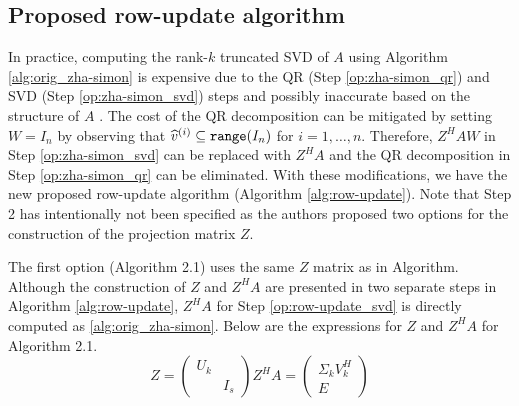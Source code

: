 \subsection{Proposed row-update algorithm}

In practice, computing the rank-$k$ truncated SVD of $A$ using Algorithm \ref{alg:orig_zha-simon} is expensive due to the QR (Step \ref{op:zha-simon_qr}) and SVD (Step \ref{op:zha-simon_svd}) steps and possibly inaccurate based on the structure of $A$ \cite{Kalantzis2021}.
The cost of the QR decomposition can be mitigated by setting $W=I_n$ by observing that $\hv^{(i)}\subseteq\verb+range+(I_n)$ for $i=1,\dots,n$.
Therefore, $Z^H AW$ in Step \ref{op:zha-simon_svd} can be replaced with $Z^H A$ and the QR decomposition in Step \ref{op:zha-simon_qr} can be eliminated.
With these modifications, we have the new proposed row-update algorithm (Algorithm \ref{alg:row-update}).
Note that Step 2 has intentionally not been specified as the authors proposed two options for the construction of the projection matrix $Z$. 

The first option (Algorithm 2.1) uses the same $Z$ matrix as in Algorithm. Although the construction of $Z$ and $Z^H A$ are presented in two separate steps in Algorithm \ref{alg:row-update}, $Z^H A$ for Step \ref{op:row-update_svd} is directly computed as  \ref{alg:orig_zha-simon}. Below are the expressions for $Z$ and $Z^H A$ for Algorithm 2.1.
\begin{subequations}\label{eq:zha-simon_matrices}
\begin{equation}
  Z=\begin{pmatrix} U_k & \\ & I_s \end{pmatrix}
  \label{eq:zha-simon_Z}
\end{equation}
\begin{equation}
  Z^H A =
  \begin{pmatrix}
  \Sigma_k V_k^H \\
  E
  \end{pmatrix}
  \label{eq:zha-simon_ZHA}
\end{equation}
\end{subequations}


